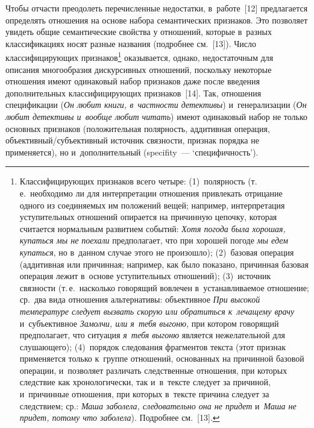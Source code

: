 \begin{multicols}{2}
Чтобы отчасти преодолеть перечисленные недостатки, в~работе~[12] 
предлагается определять отношения на основе набора семантических 
признаков. Это позволяет увидеть общие семантические свойства у 
отношений, которые в~разных классификациях носят разные названия 
(подробнее см.~[13]). Число классифицирующих 
признаков\footnote{Классифицирующих признаков всего четыре: 
(1)~полярность (т.\,е.\ необходимо ли для интерпретации отношения 
привлекать отрицание одного из соединяемых им положений вещей; 
например, интерпретация уступительных отношений опирается на причинную 
цепочку, которая считается нормальным развитием событий: \textit{Хотя 
погода была хорошая, купаться мы не поехали} предполагает, что при 
хорошей погоде \textit{мы едем купаться}, но в~данном случае этого не 
произошло); (2)~базовая операция (аддитивная или причинная; например, как 
было показано, причинная базовая операция лежит в~основе уступительных 
отношений); (3)~источник связности (т.\,е.\ насколько говорящий вовлечен 
в~устанавливаемое отношение; ср.\ два вида отношения альтернативы: 
объективное \textit{При высокой температуре следует вызвать скорую или 
обратиться к~лечащему врачу} и~субъективное \textit{Замолчи, или я~тебя 
выгоню}, при котором говорящий предполагает, что ситуация \textit{я~тебя 
выгоню} является нежелательной для слушающего); (4)~порядок следования 
фрагментов текста (этот признак применяется только к~группе отношений, 
основанных на причинной базовой операции, и~позволяет различать 
следственные отношения, при которых следствие как хронологически, так 
и~в~тексте следует за причиной, и~причинные отношения, при которых в~тексте 
причина следует за следствием; ср.: \textit{Маша заболела, следовательно она 
не придет} и~\textit{Маша не придет, потому что заболела}). Подробнее 
см.~[13].} оказывается, однако, недостаточным для описания многообразия 
дискурсивных отношений, поскольку некоторые отношения имеют 
одинаковый набор признаков даже после введения дополнительных 
классифицирующих признаков~[14]. Так, отношения спецификации (\textit{Он 
любит книги, в~частности детективы}) и~генерализации (\textit{Он любит 
детективы и~вообще любит читать}) имеют одинаковый набор не только 
основных признаков (положительная полярность, аддитивная операция, 
объ\-ек\-тив\-ный/субъ\-ек\-тив\-ный источник связности, признак порядка не 
применяется), но и~дополнительный (specifity~--- `специфичность'). 

\begin{table*}\small  %
\begin{center}
\vspace*{2ex}


\end{center}
\end{table*}
\end{multicols}

